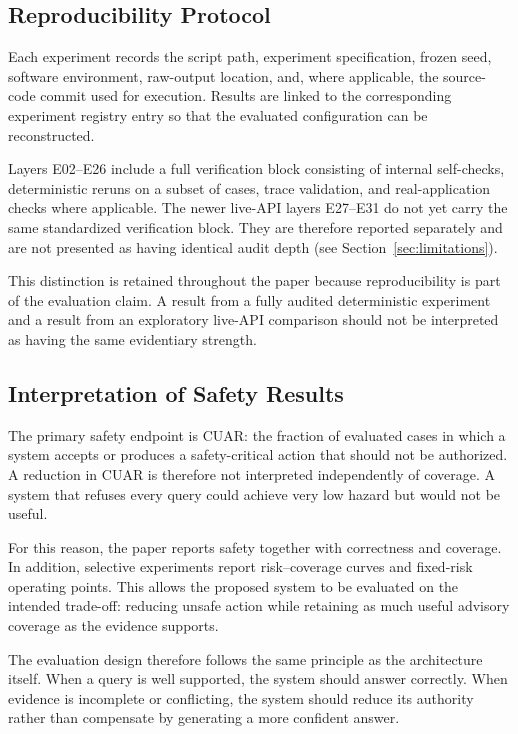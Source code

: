 \documentclass[a4paper,fleqn]{cas-dc}
\begin{document}
\subsection{Reproducibility Protocol}

Each experiment records the script path, experiment specification, frozen seed, software environment, raw-output location, and, where applicable, the source-code commit used for execution. Results are linked to the corresponding experiment registry entry so that the evaluated configuration can be reconstructed.

Layers E02--E26 include a full verification block consisting of internal self-checks, deterministic reruns on a subset of cases, trace validation, and real-application checks where applicable. The newer live-API layers E27--E31 do not yet carry the same standardized verification block. They are therefore reported separately and are not presented as having identical audit depth (see Section~\ref{sec:limitations}).

This distinction is retained throughout the paper because reproducibility is part of the evaluation claim. A result from a fully audited deterministic experiment and a result from an exploratory live-API comparison should not be interpreted as having the same evidentiary strength.

\subsection{Interpretation of Safety Results}

The primary safety endpoint is CUAR: the fraction of evaluated cases in which a system accepts or produces a safety-critical action that should not be authorized. A reduction in CUAR is therefore not interpreted independently of coverage. A system that refuses every query could achieve very low hazard but would not be useful.

For this reason, the paper reports safety together with correctness and coverage. In addition, selective experiments report risk--coverage curves and fixed-risk operating points. This allows the proposed system to be evaluated on the intended trade-off: reducing unsafe action while retaining as much useful advisory coverage as the evidence supports.

The evaluation design therefore follows the same principle as the architecture itself. When a query is well supported, the system should answer correctly. When evidence is incomplete or conflicting, the system should reduce its authority rather than compensate by generating a more confident answer.
\end{document}
